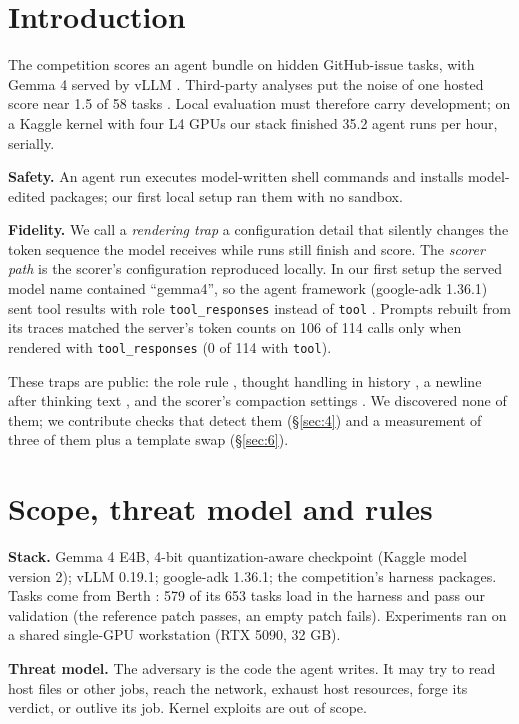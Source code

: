 \section{Introduction}\label{sec:1}

The competition scores an agent bundle on hidden GitHub-issue tasks, with Gemma 4 served by vLLM \cite{r11}. Third-party analyses put the noise of one hosted score near 1.5 of 58 tasks \cite{r3,r4}. Local evaluation must therefore carry development; on a Kaggle kernel with four L4 GPUs our stack finished 35.2 agent runs per hour, serially.

\textbf{Safety.} An agent run executes model-written shell commands and installs model-edited packages; our first local setup ran them with no sandbox.

\textbf{Fidelity.} We call a \emph{rendering trap} a configuration detail that silently changes the token sequence the model receives while runs still finish and score. The \emph{scorer path} is the scorer's configuration reproduced locally. In our first setup the served model name contained ``gemma4'', so the agent framework (google-adk 1.36.1) sent tool results with role \texttt{tool\_responses} instead of \texttt{tool} \cite{r5}. Prompts rebuilt from its traces matched the server's token counts on 106 of 114 calls only when rendered with \texttt{tool\_responses} (0 of 114 with \texttt{tool}).

These traps are public: the role rule \cite{r5}, thought handling in history \cite{r6,r7,r8}, a newline after thinking text \cite{r9}, and the scorer's compaction settings \cite{r10}. We discovered none of them; we contribute checks that detect them (\S\ref{sec:4}) and a measurement of three of them plus a template swap (\S\ref{sec:6}).

\section{Scope, threat model and rules}\label{sec:2}



\textbf{Stack.} Gemma 4 E4B, 4-bit quantization-aware checkpoint (Kaggle model version 2); vLLM 0.19.1; google-adk 1.36.1; the competition's harness packages. Tasks come from Berth \cite{r12}: 579 of its 653 tasks load in the harness and pass our validation (the reference patch passes, an empty patch fails). Experiments ran on a shared single-GPU workstation (RTX 5090, 32 GB).

\textbf{Threat model.} The adversary is the code the agent writes. It may try to read host files or other jobs, reach the network, exhaust host resources, forge its verdict, or outlive its job. Kernel exploits are out of scope.

